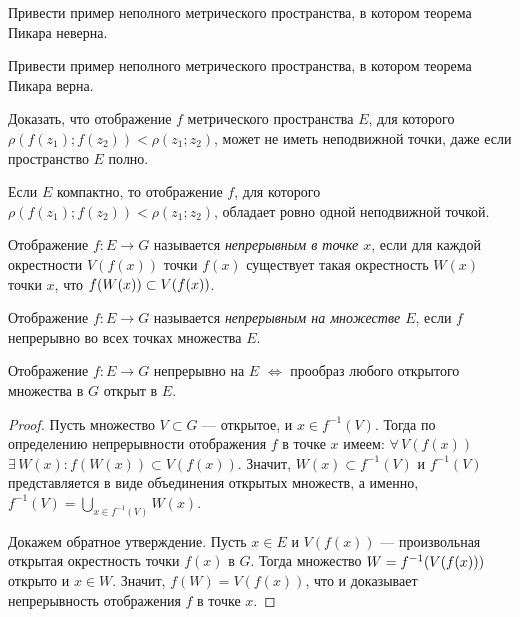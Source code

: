 \documentclass[10pt,titlepage, a4paper]{article}
\begin{document}
\begin{upr}
Привести пример неполного метрического пространства, в котором
теорема Пикара неверна.
\end{upr}

\begin{upr}
Привести пример неполного метрического пространства, в котором
теорема Пикара верна.
\end{upr}

\begin{upr}
Доказать, что отображение $f$ метрического пространства $E$, для
которого $\rho(f(z_1);f(z_2))<\rho(z_1;z_2)$, может не иметь
неподвижной точки, даже если пространство $E$ полно.
\end{upr}

\begin{upr}
Если $E$ компактно, то отображение $f$, для которого
$\rho(f(z_1);f(z_2))<\rho(z_1;z_2)$, обладает ровно одной
неподвижной точкой.
\end{upr}
\clearpage

\lecture

\vspace{-20pt}


\begin{defen}
Отображение $f\colon E\to G$ называется \emph{непрерывным в точке
$x$}, если для каждой окрестности $V(f(x))$ точки $f(x)$ существует
такая окрестность $W(x)$ точки $x$, что $f(W(x))\p\subset V(f(x))$.
\end{defen}

\begin{defen}
Отображение $f\colon E\to G$ называется \emph{непрерывным на
множестве $E$}, если $f$ непрерывно во всех точках множества $E$.
\end{defen}

\begin{predl}
Отображение $f\colon E\to G$ непрерывно на $E$ $\Leftrightarrow$
прообраз любого открытого множества в $G$ открыт в $E$.
\end{predl}

\begin{proof}
Пусть множество $V\subset G$ --- открытое, и $x\in f^{-1}(V)$. Тогда
по определению непрерывности отображения $f$ в точке $x$ имеем:
$\forall\,V(f(x))$\;\;$\exists\,W(x):f(W(x))\subset V(f(x))$.
Значит, $W(x)\subset f^{-1}(V)$ и $f^{-1}(V)$ представляется в виде
объединения открытых множеств, а именно,
$f^{-1}(V)=\bigcup\limits_{x\in f^{-1}(V)}W(x)$.

Докажем обратное утверждение. Пусть $x\in E$ и $V(f(x))$ ---
произвольная открытая окрестность точки $f(x)$ в $G$. Тогда
множество $W\p=f^{-1}(V(f(x)))$ открыто и $x\in W$. Значит,
$f(W)=V(f(x))$, что и доказывает непрерывность отображения $f$ в
точке $x$.
\end{proof}
\end{document}
